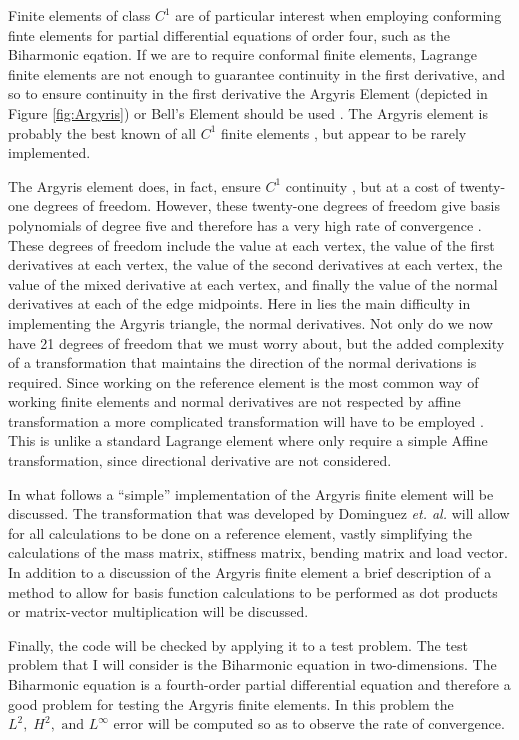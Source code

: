 Finite elements of class $C^1$ are of particular interest when employing
conforming finte elements for partial differential equations of order four, such
as the Biharmonic eqation. If we are to require conformal finite elements,
Lagrange finite elements are not enough to guarantee continuity in the first
derivative, and so to ensure continuity in the first derivative the Argyris
Element (depicted in Figure \ref{fig:Argyris}) or Bell's Element should
be used \cite{Johnson}. The Argyris element is probably the best known of all
$C^1$ finite elements \cite{Argyris,DominguezA}, but appear to be rarely
implemented.



The Argyris element does, in fact, ensure $C^1$ continuity
\cite{DominguezA,Okabe}, but at a cost of twenty-one degrees of freedom.
However, these twenty-one degrees of freedom give basis polynomials of degree
five and therefore has a very high rate of convergence \cite{DominguezA}. These
degrees of freedom include the value at each vertex, the value of the first
derivatives at each vertex, the value of the second derivatives at each vertex,
the value of the mixed derivative at each vertex, and finally the value of the
normal derivatives at each of the edge midpoints. Here in lies the main
difficulty in implementing the Argyris triangle, the normal derivatives. Not
only do we now have 21 degrees of freedom that we must worry about, but the
added complexity of a transformation that maintains the direction of the normal
derivations is required. Since working on the reference element is the most
common way of working finite elements and normal derivatives are not respected
by affine transformation a more complicated transformation will have to be
employed \cite{DominguezA}. This is unlike a standard Lagrange element where
only require a simple Affine transformation, since directional derivative are
not considered.

In what follows a ``simple'' implementation of the Argyris finite element will
be discussed. The transformation that was developed by Dominguez \emph{et. al.}
will allow for all calculations to be done on a reference element, vastly
simplifying the calculations of the mass matrix, stiffness matrix, bending
matrix and load vector. In addition to a discussion of the Argyris finite
element a brief description of a method to allow for basis function calculations
to be performed as dot products or matrix-vector multiplication will be
discussed.

Finally, the code will be checked by applying it to a test problem. The test
problem that I will consider is the Biharmonic equation in two-dimensions. The
Biharmonic equation is a fourth-order partial differential equation and
therefore a good problem for testing the Argyris finite elements. In this
problem the $L^2,\; H^2,\text{ and } L^{\infty}$ error will be computed so as to
observe the rate of convergence.
